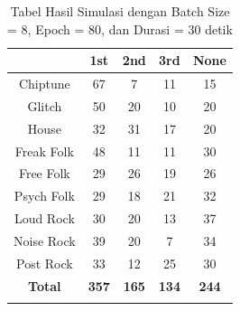 \begin{longtable}[c]{|c|c|c|c|c|}
	\hline
	\textbf{}      & \textbf{1st} & \textbf{2nd} & \textbf{3rd} & \textbf{None} \\ \hline
	\endfirsthead
	\endhead
	Chiptune       & 67           & 7            & 11           & 15            \\ \hline
	Glitch         & 50           & 20           & 10           & 20            \\ \hline
	House          & 32           & 31           & 17           & 20            \\ \hline
	Freak Folk     & 48           & 11           & 11           & 30            \\ \hline
	Free Folk      & 29           & 26           & 19           & 26            \\ \hline
	Psych Folk     & 29           & 18           & 21           & 32            \\ \hline
	Loud Rock      & 30           & 20           & 13           & 37            \\ \hline
	Noise Rock     & 39           & 20           & 7            & 34            \\ \hline
	Post Rock      & 33           & 12           & 25           & 30            \\ \hline
	\textbf{Total} & \textbf{357} & \textbf{165} & \textbf{134} & \textbf{244}  \\ \hline
	\caption{Tabel Hasil Simulasi dengan Batch Size = 8, Epoch = 80, dan Durasi = 30 detik}
	\label{tab:my-table}\\
\end{longtable}

